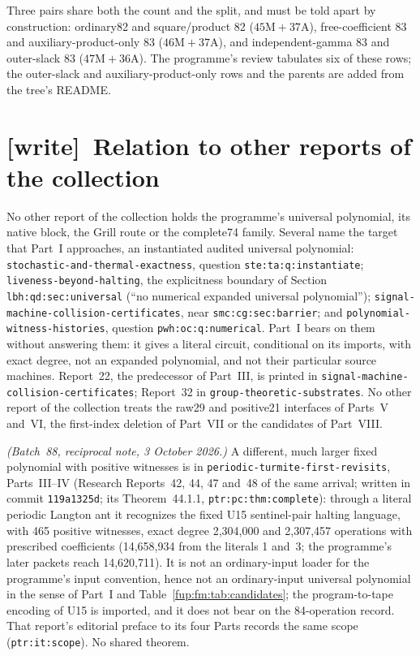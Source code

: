 \documentclass[11pt,letterpaper]{article}
\theoremstyle{definition}\newtheorem{definition}[theorem]{Definition}
\theoremstyle{remark}\newtheorem{remark}[theorem]{Remark}
\newcommand{\wtag}{\textup{[write]}}
\newcommand{\rw}[1]{\nolinkurl{#1}}%
\begin{document}
\noindent Three pairs share both the count and the split, and must be told apart by construction: ordinary82 and square/product 82 ($45\mathrm M+37\mathrm A$), free-coefficient 83 and auxiliary-product-only 83 ($46\mathrm M+37\mathrm A$), and independent-gamma 83 and outer-slack 83 ($47\mathrm M+36\mathrm A$). The programme's review tabulates six of these rows; the outer-slack and auxiliary-product-only rows and the parents are added from the tree's README.

\section{\wtag\ Relation to other reports of the collection}\label{fup:fm:sec:relation}
No other report of the collection holds the programme's universal polynomial, its native block, the Grill route or the complete74 family. Several name the target that Part~I approaches, an instantiated audited universal polynomial: \rw{stochastic-and-thermal-exactness}, question \rw{ste:ta:q:instantiate}; \rw{liveness-beyond-halting}, the explicitness boundary of Section \rw{lbh:qd:sec:universal} (``no numerical expanded universal polynomial''); \rw{signal-machine-collision-certificates}, near \rw{smc:cg:sec:barrier}; and \rw{polynomial-witness-histories}, question \rw{pwh:oc:q:numerical}. Part~I bears on them without answering them: it gives a literal circuit, conditional on its imports, with exact degree, not an expanded polynomial, and not their particular source machines. Report~22, the predecessor of Part~III, is printed in \rw{signal-machine-collision-certificates}; Report~32 in \rw{group-theoretic-substrates}. No other report of the collection treats the raw29 and positive21 interfaces of Parts~V and~VI, the first-index deletion of Part~VII or the candidates of Part~VIII.

\emph{(Batch~88, reciprocal note, 3 October 2026.)} A different, much larger fixed polynomial with positive witnesses is in \rw{periodic-turmite-first-revisits}, Parts~III--IV (Research Reports~42, 44, 47 and~48 of the same arrival; written in commit \texttt{119a1325d}; its Theorem~44.1.1, \rw{ptr:pc:thm:complete}): through a literal periodic Langton ant it recognizes the fixed U15 sentinel-pair halting language, with 465 positive witnesses, exact degree 2,304,000 and 2,307,457 operations with prescribed coefficients (14,658,934 from the literals 1 and~3; the programme's later packets reach 14,620,711). It is not an ordinary-input loader for the programme's input convention, hence not an ordinary-input universal polynomial in the sense of Part~I and Table~\ref{fup:fm:tab:candidates}; the program-to-tape encoding of U15 is imported, and it does not bear on the 84-operation record. That report's editorial preface to its four Parts records the same scope (\rw{ptr:it:scope}). No shared theorem.
\end{document}

